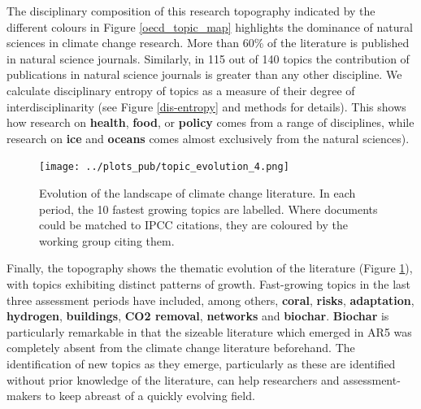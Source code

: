 \documentclass{article}
\begin{document}
\begin{linenumbers}
		
		The disciplinary composition of this research topography indicated by the different colours in Figure \ref{oecd_topic_map} highlights the dominance of natural sciences in climate change research. More than 60\% of the literature is published in natural science journals. Similarly, in 115 out of 140 topics the contribution of publications in natural science journals is greater than any other discipline. We calculate disciplinary entropy of topics as a measure of their degree of interdisciplinarity (see Figure \ref{dis-entropy} and methods for details). This shows how research on \textbf{health}, \textbf{food}, or \textbf{policy} comes from a range of disciplines, while research on \textbf{ice} and \textbf{oceans} comes almost exclusively from the natural sciences). 
		
		
		\begin{figure}
			\begin{center}
				\texttt{[image: ../plots\_pub/topic\_evolution\_4.png]}
				\caption{Evolution of the landscape of climate change literature. In each period, the 10 fastest growing topics are labelled. Where documents could be matched to IPCC citations, they are coloured by the working group citing them.}
				\label{evolution-map}
			\end{center}
		\end{figure}
		
		Finally, the topography shows the thematic evolution of the literature (Figure \ref{evolution-map}), with topics exhibiting distinct patterns of growth. Fast-growing topics in the last three assessment periods have included, among others, \textbf{coral}, \textbf{risks}, \textbf{adaptation}, \textbf{hydrogen}, \textbf{buildings}, \textbf{CO2 removal}, \textbf{networks} and \textbf{biochar}. \textbf{Biochar} is particularly remarkable in that the sizeable literature which emerged in AR5 was completely absent from the climate change literature beforehand. 
		The identification of new topics as they emerge, particularly as these are identified without prior knowledge of the literature, can help researchers and assessment-makers to keep abreast of a quickly evolving field.
		
		

\end{linenumbers}
\end{document}
